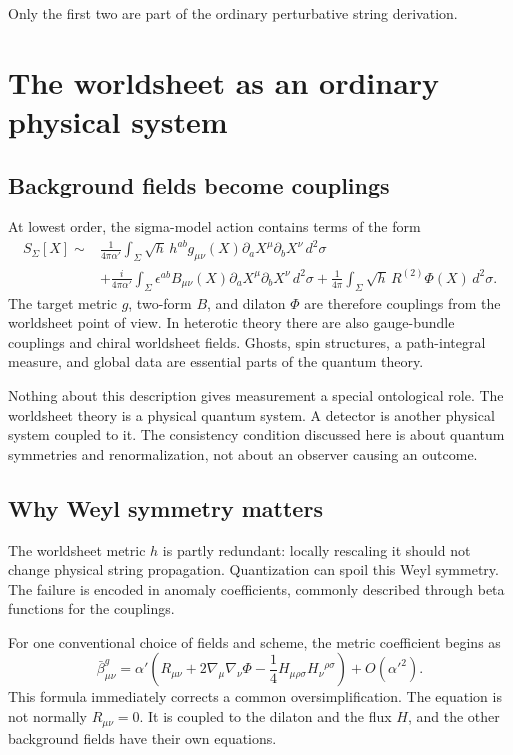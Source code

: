 \documentclass[11pt]{article}
\begin{document}
Only the first two are part of the ordinary perturbative string derivation.

\section{The worldsheet as an ordinary physical system}

\subsection{Background fields become couplings}

At lowest order, the sigma-model action contains terms of the form
\begin{align}
S_\Sigma[X]
\sim{}&\frac{1}{4\pi\alpha'}\int_\Sigma
\sqrt h\,h^{ab}g_{\mu\nu}(X)
\partial_aX^\mu\partial_bX^\nu\,d^2\sigma \nonumber\\
&+\frac{i}{4\pi\alpha'}\int_\Sigma
\epsilon^{ab}B_{\mu\nu}(X)
\partial_aX^\mu\partial_bX^\nu\,d^2\sigma
+\frac{1}{4\pi}\int_\Sigma\sqrt h\,R^{(2)}\Phi(X)\,d^2\sigma .
\label{eq:sigma}
\end{align}
The target metric \(g\), two-form \(B\), and dilaton \(\Phi\) are therefore
couplings from the worldsheet point of view.  In heterotic theory there are
also gauge-bundle couplings and chiral worldsheet fields.  Ghosts, spin
structures, a path-integral measure, and global data are essential parts of
the quantum theory.

Nothing about this description gives measurement a special ontological role.
The worldsheet theory is a physical quantum system.  A detector is another
physical system coupled to it.  The consistency condition discussed here is
about quantum symmetries and renormalization, not about an observer causing an
outcome.

\subsection{Why Weyl symmetry matters}

The worldsheet metric \(h\) is partly redundant: locally rescaling it should
not change physical string propagation.  Quantization can spoil this Weyl
symmetry.  The failure is encoded in anomaly coefficients, commonly described
through beta functions for the couplings.

For one conventional choice of fields and scheme, the metric coefficient
begins as
\[
\bar\beta^g_{\mu\nu}
=\alpha'\left(
R_{\mu\nu}+2\nabla_\mu\nabla_\nu\Phi
-\frac14H_{\mu\rho\sigma}H_\nu{}^{\rho\sigma}
\right)+O(\alpha'^2).
\]
This formula immediately corrects a common oversimplification.  The equation
is not normally \(R_{\mu\nu}=0\).  It is coupled to the dilaton and the flux
\(H\), and the other background fields have their own equations.
\end{document}
